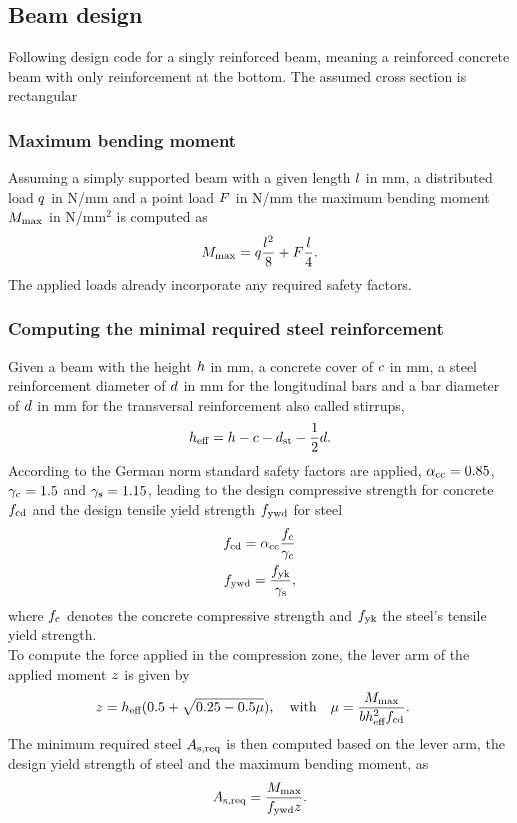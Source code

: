 \subsection{Beam design}
Following design code \citeauthor{DIN1992-1-1} for a singly reinforced beam, meaning a reinforced concrete beam with only reinforcement at the bottom.
The assumed cross section is rectangular

\subsubsection{Maximum bending moment}
Assuming a simply supported beam with a given length $l$ in mm, a distributed load $q$ in N/mm and a point load $F$ in N/mm
the maximum bending moment $M_{\text{max}}$ in N/mm$^2$ is computed as
\begin{align}
	M_{\text{max}}= q \frac{l^2}{8} + F \frac{l}{4}.
\end{align}
The applied loads already incorporate any required safety factors.
\subsubsection{Computing the minimal required steel reinforcement}
Given a beam with the height $h$ in mm, a concrete cover of $c$ in mm, a steel reinforcement diameter of $d$ in mm for the longitudinal bars and a bar diameter of $d$ in mm for the transversal reinforcement also called stirrups,
\begin{align}
	h_{\text{eff}} = h - c - d_{\text{st}} - \frac{1}{2} d.
\end{align}
According to the German norm standard safety factors are applied, $\alpha_{\text{cc}} = 0.85$, $\gamma_{\text{c}} = 1.5$ and $\gamma_{\text{s}} = 1.15$, leading to the design compressive strength for concrete $f_{\text{cd}}$ and  the design tensile yield strength $f_{\text{ywd}}$ for steel
\begin{align}
	f_{\text{cd}} = \alpha_{\text{cc}} \frac{f_{\text{c}} }{\gamma_{\text{c}}}\\
	f_{\text{ywd}} = \frac{f_{\text{yk}}}{\gamma_{\text{s}}},
\end{align}
where $f_{\text{c}}$ denotes the concrete compressive strength and $f_{\text{yk}}$ the steel's tensile yield strength.\\
To compute the force applied in the compression zone, the lever arm of the applied moment $z$ is given by 
\begin{align}
	z &= h_{\text{eff}}(0.5+\sqrt{0.25-0.5 \mu}),\quad \text{with}\quad
	\mu = \frac{M_{\text{max}} }{b h_{\text{eff}}^2 f_{\text{cd}}}. \label{eq:compr_str_constr}
\end{align}
The minimum required steel $A_{\text{s,req}}$ is then computed based on the lever arm, the design yield strength of steel and the maximum bending moment, as
\begin{align}
	A_{\text{s,req}} = \frac{M_{\text{max}}}{f_{\text{ywd}} z}.
\end{align}
